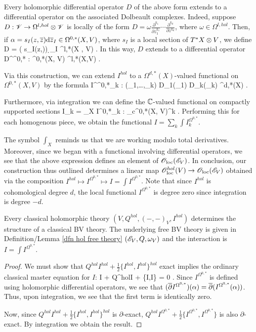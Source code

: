 \documentclass[10pt]{article}
\begin{document}
Every holomorphic differential operator $D$ of the above form extends to a differential operator on the associated Dolbeault complexes.
Indeed, suppose $D : \mathscr V \to \Omega^{l,hol} \otimes \mathscr V$ is locally of the form $D = \omega \frac{\partial^{k_1}}{\partial z_1^{k_1}} \cdots \frac{\partial^{k_d}}{\partial z^{k_d}}$, where $\omega \in \Omega^{l,hol}$.
Then, if $\alpha = s_I (z,\overline{z}) {\rm d} \overline{z}_I \in \Omega^{0,*}(X, V)$, where $s_I$ is a local section of $T^*X \otimes V$, we define
\ben
D \alpha = \omega \wedge \left( \cdots {} s_I(z,\zbar)\right) \d \zbar_I \in \Omega^{l,*}(X , V) .
\een
In this way, $D$ extends to a differential operator 
\ben
D^{\Omega^{0,*}} : \Omega^{0,*}(X, V) \to \Omega^{l,*}(X,V) . 
\een

Via this construction, we can extend $I^{hol}$ to a $\Omega^{d,*}(X)$-valued functional on $\Omega^{0,*}(X, V)$ by the formula
\ben
I^{\Omega^{0,*}}_k : (\alpha_1,\ldots,\alpha_k) \mapsto D_1(\alpha_1) \cdots D_k(\alpha_k) \in  \Omega^{d,*}(X) .
\een

Furthermore, via integration we can define the $\mathbb C$-valued functional on compactly supported sections
\ben
I_k = \int_X I^{0,*}_k : \Omega_c^{0,*}(X, V)^{\tensor k} \to \CC .
\een
Performing this for each homogenous piece, we obtain the functional $I = \sum_k \int I^{\Omega^{0,*}}_k$. 

The symbol $\int_X$ reminds us that we are working modulo total derivatives.
Moreover, since we began with a functional involving differential operators, we see that the above expression defines an element of ${\mathscr O}_{\rm loc}(\mathscr E_V)$. 
In conclusion, our construction thus outlined determines a linear map $\mathscr O_{\rm loc}^{hol}(V) \to {\mathscr O}_{\rm loc}(\mathscr E_V)$ obtained via the composition $I^{hol} \mapsto I^{\Omega^{0,*}} \mapsto I = \int I^{\Omega^{0,*}}$. 
Note that since $I^{hol}$ is cohomological degree $d$, the local functional $I^{\Omega^{0,*}}$ is degree zero since integration is degree $-d$. 

\begin{lem} Every classical holomorphic theory $(V, Q^{hol},(-,-)_V, I^{hol})$ determines the structure of a classical BV theory.
The underlying free BV theory is given in Definition/Lemma \ref{dfn hol free theory} $(\mathscr E_V, Q, \omega_V)$ and the interaction is $I = \int I^{\Omega^{0,*}}$. 
\end{lem}

\begin{proof}
We must show that $Q^{hol}I^{hol} + \frac{1}{2} \{I^{hol},I^{hol}\}^{hol}$ exact implies the ordinary classical master equation for $I$:
\ben
\dbar I + Q^{hol}I +  \{I,I\} = 0 .
\een
Since $I^{\Omega^{0,*}}$ is defined using holomorphic differential operators, we see that $(\overline{\partial} I^{\Omega^{0,*}} ) (\alpha) = \overline{\partial} (I^{\Omega^{0,*}} (\alpha))$. 
Thus, upon integration, we see that the first term is identically zero.

Now, since $Q^{hol}I^{hol} + \frac{1}{2} \{I^{hol},I^{hol}\}^{hol}$ is $\partial$-exact, $Q^{hol}I^{\Omega^{0,*}} + \frac{1}{2} \{I^{\Omega^{0,*}},I^{\Omega^{0,*}}\}$ is also $\partial$-exact.
By integration we obtain the result.
\end{proof}
\end{document}

